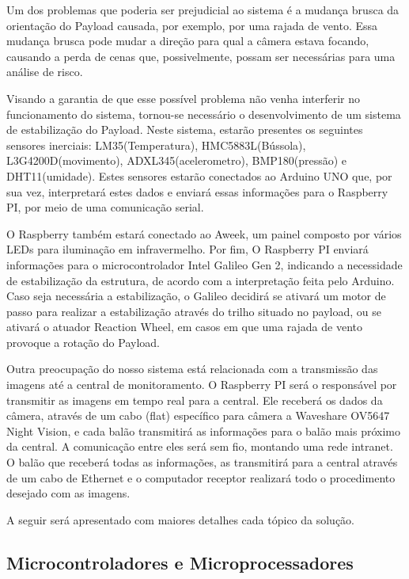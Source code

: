 	Um dos problemas que poderia ser prejudicial ao sistema é a mudança brusca da orientação do Payload causada, por exemplo, por uma rajada de vento. Essa mudança brusca pode mudar a direção para qual a câmera estava focando, causando a perda de cenas que, possivelmente, possam ser necessárias para uma análise de risco.

	Visando a garantia de que esse possível problema não venha interferir no funcionamento do sistema, tornou-se necessário o desenvolvimento de um sistema de estabilização do Payload. Neste sistema, estarão presentes os seguintes sensores  inerciais: LM35(Temperatura), HMC5883L(Bússola), L3G4200D(movimento), ADXL345(acelerometro), BMP180(pressão) e DHT11(umidade). Estes sensores estarão conectados ao Arduino UNO que, por sua vez, interpretará estes dados e enviará essas informações para o Raspberry PI, por meio de uma comunicação serial.

	O Raspberry também estará conectado ao Aweek, um painel composto por vários LEDs para iluminação em infravermelho. Por fim, O Raspberry PI enviará informações para o microcontrolador Intel Galileo Gen 2, indicando a necessidade de estabilização da estrutura, de acordo com a interpretação feita pelo Arduino. Caso seja necessária a estabilização, o Galileo decidirá se ativará um motor de passo para realizar a estabilização através do trilho situado no payload, ou se ativará o atuador Reaction Wheel, em casos em que uma rajada de vento provoque a rotação do Payload.

	Outra preocupação do nosso sistema está relacionada com a transmissão das imagens até a central de monitoramento. O Raspberry PI será o responsável por transmitir as imagens em tempo real para a central. Ele receberá os dados da câmera, através de um cabo (flat) específico para câmera a Waveshare OV5647 Night Vision, e cada balão transmitirá as informações para o balão mais próximo da central. A comunicação entre eles será sem fio, montando uma rede intranet. O balão que receberá todas as informações, as transmitirá para a central através de um cabo de Ethernet e o computador receptor realizará todo o procedimento desejado com as imagens.

	A seguir será apresentado com maiores detalhes cada tópico da solução.

\subsection{Microcontroladores e Microprocessadores}

